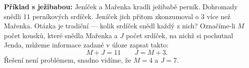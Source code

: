 \wikitextrule
\begin{example}\label{mai:exam005}
  \textbf{Příklad s ježibabou:}\newline
  Jeníček a Mařenka kradli ježibabě perník. Dohromady snědli \num{11} perníkových srdíček. Jeníček 
  jich přitom zkonzumoval o \num{3} více než Mařenka. Otázka je tradiční — kolik srdíček snědl 
  každý z nich? Označíme-li \(M\) počet kousků, které snědla Mařenka a \(J\) počet srdíček, na 
  nichž si pochutnal Jenda, můžeme informace zadané v úloze zapsat takto:
    \begin{equation*}
      M + J = 11 \qquad J = M + 3.
    \end{equation*}
  Řešení není problémem, snadno vidíme, že \(M = 4\) a \(J = 7\).
\end{example}